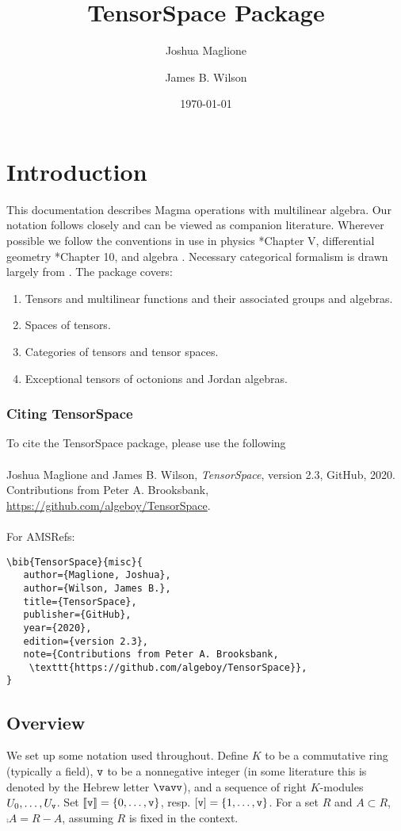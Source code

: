 \documentclass{documentation}
\title{TensorSpace Package}
\author{Joshua Maglione}
\author{James B. Wilson}
\date{\today}
\begin{document}
\frontmatter

\dominitoc
\maketitle
\tableofcontents

\mainmatter

\chapter{Introduction}

This documentation describes Magma operations with multilinear algebra. Our
notation follows \cite{FMW:densors} closely and can be viewed as companion
literature. Wherever possible we follow the conventions in use in physics
\cite{Weyl}*{Chapter V}, differential geometry \cite{Lee:geom}*{Chapter 10}, and
algebra \cite{Landsberg:tensors}. Necessary categorical formalism is drawn
largely from \cite{Wilson:division}. The package covers:
\begin{enumerate}
\item Tensors and multilinear functions and their associated groups and algebras.
\item Spaces of tensors.
\item Categories of tensors and tensor spaces.
\item Exceptional tensors of octonions and Jordan algebras.
\end{enumerate}
\bigskip

\subsection*{Citing TensorSpace} 
To cite the TensorSpace package, please use the following\\
\\
Joshua Maglione and James B. Wilson, \emph{TensorSpace}, version 2.3, GitHub,
2020. Contributions from Peter A. Brooksbank,
\url{https://github.com/algeboy/TensorSpace}. \\
\\
For AMSRefs:
\begin{verbatim}
\bib{TensorSpace}{misc}{
   author={Maglione, Joshua},
   author={Wilson, James B.},
   title={TensorSpace},
   publisher={GitHub},
   year={2020},
   edition={version 2.3},
   note={Contributions from Peter A. Brooksbank, 
    \texttt{https://github.com/algeboy/TensorSpace}},
}
\end{verbatim}


\section{Overview}
We set up some notation used throughout. Define $K$ to be a commutative ring
(typically a field), $\operatorname{\mathtt{v}}$ to be a nonnegative integer (in some literature this
is denoted by the Hebrew letter $\vavv$), and a sequence of right $K$-modules
$U_0,\dots,U_{\operatorname{\mathtt{v}}}$. Set $\llbracket \operatorname{\mathtt{v}}\rrbracket=\{0,\dots,\operatorname{\mathtt{v}}\}$, resp.
$[\operatorname{\mathtt{v}}]=\{1,\ldots,\operatorname{\mathtt{v}}\}$. For a set $R$ and $A\subset R$, $\comp{A}=R-A$,
assuming $R$ is fixed in the context.
\end{document}
